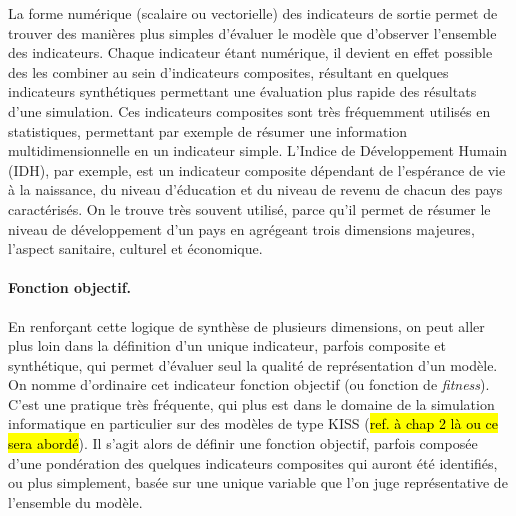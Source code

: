 La forme numérique
(scalaire ou vectorielle) des indicateurs de sortie permet de trouver des manières plus simples d'évaluer le modèle que d'observer l'ensemble des indicateurs.
Chaque indicateur étant numérique, il devient en effet possible des les combiner au sein d'indicateurs composites, résultant en quelques indicateurs synthétiques permettant une évaluation plus rapide des résultats d'une simulation.
Ces indicateurs composites sont très fréquemment utilisés en statistiques, permettant par exemple de résumer une information multidimensionnelle en un indicateur simple.
L'Indice de Développement Humain (IDH), par exemple, est un indicateur composite dépendant de l'espérance de vie à la naissance, du niveau d'éducation et du niveau de revenu de chacun des pays caractérisés.
On le trouve très souvent utilisé, parce qu'il permet de résumer le niveau de développement d'un pays en agrégeant trois dimensions majeures, l'aspect sanitaire, culturel et économique.

\paragraph{Fonction objectif.}

En renforçant cette logique de synthèse de plusieurs dimensions, on peut aller plus loin dans la définition d'un unique indicateur, parfois composite et synthétique, qui permet d'évaluer seul la qualité de représentation d'un modèle.
On nomme d'ordinaire cet indicateur \og fonction objectif\fg{} (ou \og fonction de \textit{fitness}\fg{}).
C'est une pratique très fréquente, qui plus est dans le domaine de la simulation informatique en particulier sur des modèles de type \og KISS\fg{} (\hl{ref. à chap 2 là ou ce sera abordé}).
Il s'agit alors de définir une \og fonction objectif\fg{}, parfois composée d'une pondération des quelques indicateurs composites qui auront été identifiés, ou plus simplement, basée sur une unique variable que l'on juge représentative de l'ensemble du modèle.

